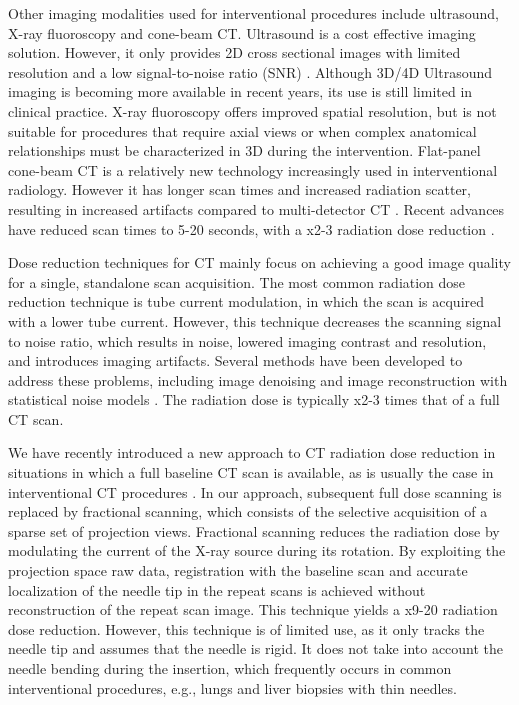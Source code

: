 Other imaging modalities used for interventional procedures include ultrasound, X-ray fluoroscopy and cone-beam CT.
Ultrasound is a cost effective imaging solution. However, it only provides 2D cross sectional images with limited resolution and a low signal-to-noise ratio (SNR) \cite{sheafor2000comparison}. Although 3D/4D Ultrasound imaging is becoming more available in recent years, its use is still limited in clinical practice.
X-ray fluoroscopy offers improved spatial resolution, but is not suitable for procedures that require axial views or when complex anatomical relationships must be characterized in 3D during the intervention.
Flat-panel cone-beam CT is a relatively new technology increasingly used in interventional radiology. However it has longer scan times and increased radiation scatter, resulting in increased artifacts compared to multi-detector CT \cite{orth2008cbct}. Recent advances have reduced scan times to 5-20 seconds, with a x2-3 radiation dose reduction \cite{dynact}.

Dose reduction techniques for CT mainly focus on achieving a good image quality for a single, standalone scan acquisition. The most common radiation dose reduction technique is tube current modulation, in which the scan is acquired with a lower tube current. However, this technique decreases the scanning signal to noise ratio, which results in noise, lowered imaging contrast and resolution, and introduces imaging artifacts. Several methods have been developed to address these problems, including image denoising \cite{manduca2009projection} and image reconstruction with statistical noise models  \cite{zhang2016statistical,kim2015sparseview,niu2014sparse,liu2014total}. The radiation dose is typically x2-3 times that of a full CT scan. 

We have recently introduced a new approach to CT radiation dose reduction in situations in which a full baseline CT scan is available, as is usually the case in interventional CT procedures \cite{medan2017sparse, medan2017reduced}. In our approach, subsequent full dose scanning is replaced by fractional scanning, which consists of the selective acquisition of a sparse set of projection views. Fractional scanning reduces the radiation dose by modulating the current of the X-ray source during its rotation. By exploiting the projection space raw data, registration with the baseline scan and accurate localization of the needle tip in the repeat scans is achieved without reconstruction of the repeat scan image. This technique yields a x9-20 radiation dose reduction. However, this technique is of limited use, as it only tracks the needle tip and assumes that the needle is rigid. It does not take into account the needle bending during the insertion, which frequently occurs in common interventional procedures, e.g., lungs and liver biopsies with thin needles. 

